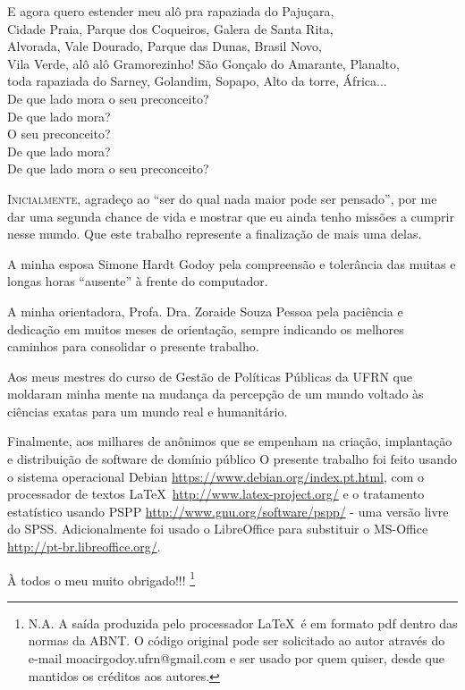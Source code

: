 \documentclass[
	12pt,				%
	openright,			%
	twoside,			%
	a4paper,			%
	chapter=TITLE,		%
	section=TITLE,		%
	subsection=TITLE,	%
	subsubsection=TITLE,%
	spanish,            %
	english,			%
	brazil				%
	]{abntex2}
\begin{document}
\begin{dedicatoria}
{       E agora quero estender meu alô pra rapaziada do Pajuçara,\\
       Cidade Praia, Parque dos Coqueiros, Galera de Santa Rita,\\
       Alvorada, Vale Dourado, Parque das Dunas, Brasil Novo,\\
       Vila Verde, alô alô Gramorezinho! São Gonçalo do Amarante, Planalto,\\ toda rapaziada do Sarney, Golandim, Sopapo, Alto da torre, África...\\
       
       De que lado mora o seu preconceito?\\
       De que lado mora?\\
       O seu preconceito?\\
       De que lado mora?\\
       De que lado mora o seu preconceito?}
\end{dedicatoria}

\begin{agradecimentos}
\lettrine[lines=2, lhang=0.33, loversize=0.25]{I}{nicialmente}, agradeço ao “ser do qual nada maior pode ser pensado”, por me dar uma segunda chance de vida e mostrar que eu ainda tenho missões a cumprir nesse mundo. Que este trabalho represente a finalização de mais uma delas.
\par
A minha esposa Simone Hardt Godoy pela compreensão e tolerância das muitas e longas horas “ausente” à frente do computador.
\par
A minha orientadora, Profa. Dra. Zoraide Souza Pessoa pela paciência e dedicação em muitos meses de orientação, sempre indicando os melhores caminhos para consolidar o presente trabalho.
\par
Aos meus mestres do curso de Gestão de Políticas Públicas da UFRN que moldaram minha mente na mudança da percepção de um mundo voltado às ciências exatas para um mundo real e humanitário. 
\par
Finalmente, aos milhares de anônimos que se empenham na criação, implantação e distribuição de software
de domínio público  O presente trabalho foi feito usando o sistema operacional Debian
\url{https://www.debian.org/index.pt.html}, com o processador de textos \LaTeX\
\url{http://www.latex-project.org/} e o tratamento estatístico usando PSPP
\url{http://www.gnu.org/software/pspp/} - uma versão livre do SPSS. Adicionalmente foi usado o
LibreOffice para substituir o MS-Office \url{http://pt-br.libreoffice.org/}. 
\par
À todos o meu muito obrigado!!! \footnote{N.A. A saída produzida pelo processador \LaTeX\  é em formato pdf
dentro das normas da ABNT. O código original pode ser solicitado ao autor através do e-mail moacirgodoy.ufrn@gmail.com
e ser usado por quem quiser, desde que mantidos os créditos aos autores.}\\
\begin{center}
	\LARGE{}
\end{center}
\end{agradecimentos}
\end{document}
